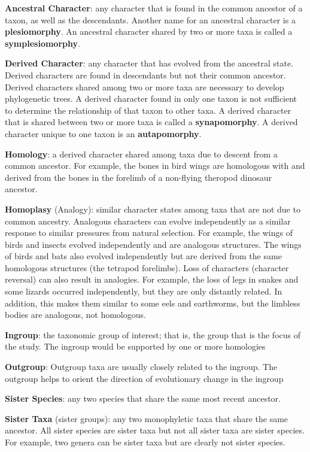 \documentclass[letterpaper]{tufte-handout}
\begin{document}
\textbf{Ancestral Character}: any character that is found in the common ancestor of a taxon, as well as the descendants.  Another name for an ancestral character is a \textbf{plesiomorphy}. An ancestral character shared by two or more taxa is called a \textbf{symplesiomorphy}.

\textbf{Derived Character}: any character that has evolved from the ancestral state. Derived characters are found in descendants but not their common ancestor. Derived characters shared among two or more taxa are necessary to develop phylogenetic trees.  A derived character found in only one taxon is not sufficient to determine the relationship of that taxon to other taxa.  A derived character that is shared between two or more taxa is called a \textbf{synapomorphy}.  A derived character unique to one taxon is an \textbf{autapomorphy}.

\textbf{Homology}: a derived character shared among taxa due to descent from a common ancestor. For example, the bones in bird wings are homologous with and derived from the bones in the forelimb of a non-flying theropod dinosaur ancestor.

\textbf{Homoplasy} (Analogy): similar character states among taxa that are not due to common ancestry. Analogous characters can evolve independently as a similar response to similar pressures from natural selection. For example, the wings of birds and insects evolved independently and are analogous structures.  The wings of birds and bats also evolved independently but are derived from the same homologous structures (the tetrapod forelimbs). Loss of characters (character reversal) can also result in analogies. For example, the loss of legs in snakes and some lizards occurred independently, but they are only distantly related. In addition, this makes them similar to some eels and earthworms, but the limbless bodies are analogous, not homologous. 

\textbf{Ingroup}: the taxonomic group of interest; that is, the group that is the focus of the study. The ingroup would be supported by one or more homologies

\textbf{Outgroup}: Outgroup taxa are usually closely related to the ingroup.  The outgroup helps to orient the direction of evolutionary change in the ingroup

\textbf{Sister Species}: any two species that share the same most recent ancestor. 

\textbf{Sister Taxa} (sister groups): any two monophyletic taxa that share the same ancestor. All sister species are sister taxa but not all sister taxa are sister species. For example, two genera can be sister taxa but are clearly not sister species.
\end{document}
